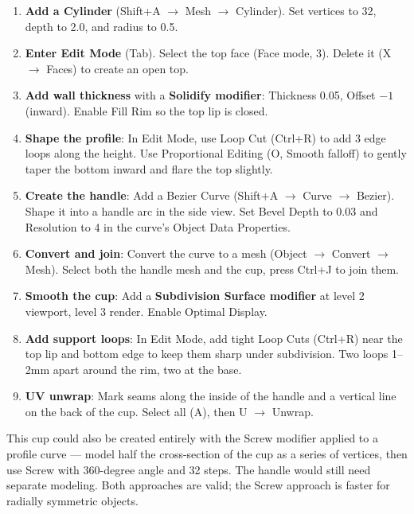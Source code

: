\begin{enumerate}[leftmargin=2em]
  \item \textbf{Add a Cylinder} (Shift+A $\rightarrow$ Mesh $\rightarrow$ Cylinder). Set vertices to 32, depth to 2.0, and radius to 0.5.

  \item \textbf{Enter Edit Mode} (Tab). Select the top face (Face mode, 3). Delete it (X $\rightarrow$ Faces) to create an open top.

  \item \textbf{Add wall thickness} with a \textbf{Solidify modifier}: Thickness 0.05, Offset $-1$ (inward). Enable Fill Rim so the top lip is closed.

  \item \textbf{Shape the profile}: In Edit Mode, use Loop Cut (Ctrl+R) to add 3 edge loops along the height. Use Proportional Editing (O, Smooth falloff) to gently taper the bottom inward and flare the top slightly.

  \item \textbf{Create the handle}: Add a Bezier Curve (Shift+A $\rightarrow$ Curve $\rightarrow$ Bezier). Shape it into a handle arc in the side view. Set Bevel Depth to 0.03 and Resolution to 4 in the curve's Object Data Properties.

  \item \textbf{Convert and join}: Convert the curve to a mesh (Object $\rightarrow$ Convert $\rightarrow$ Mesh). Select both the handle mesh and the cup, press Ctrl+J to join them.

  \item \textbf{Smooth the cup}: Add a \textbf{Subdivision Surface modifier} at level 2 viewport, level 3 render. Enable Optimal Display.

  \item \textbf{Add support loops}: In Edit Mode, add tight Loop Cuts (Ctrl+R) near the top lip and bottom edge to keep them sharp under subdivision. Two loops 1--2mm apart around the rim, two at the base.

  \item \textbf{UV unwrap}: Mark seams along the inside of the handle and a vertical line on the back of the cup. Select all (A), then U $\rightarrow$ Unwrap.
\end{enumerate}

\begin{tipbox}
This cup could also be created entirely with the Screw modifier applied to a profile curve --- model half the cross-section of the cup as a series of vertices, then use Screw with 360-degree angle and 32 steps. The handle would still need separate modeling. Both approaches are valid; the Screw approach is faster for radially symmetric objects.
\end{tipbox}

